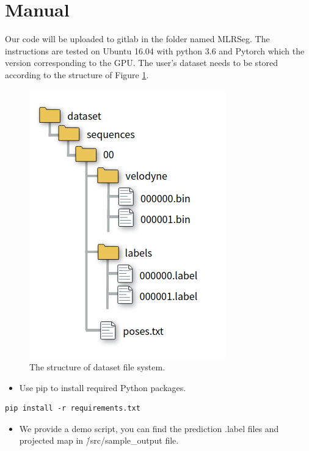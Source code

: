 \documentclass[final]{cvpr}
\begin{document}
\section{Manual}
Our code will be uploaded to gitlab in the folder named MLRSeg. The instructions are tested on Ubuntu 16.04 with python 3.6 and Pytorch which the version corresponding to the GPU. The user's dataset needs to be stored according to the structure of Figure \ref{fig:fil}.
\begin{figure}
\begin{center}
   \includegraphics[width=0.6\linewidth,height=0.8\linewidth]{latex/file.png}
\end{center}
   \caption{The structure of dataset file system.}
\label{fig:fil}
\end{figure}
\begin{itemize}
    \item Use pip to install required Python packages.
\end{itemize}
\begin{lstlisting}
pip install -r requirements.txt
\end{lstlisting}
\begin{itemize}
    \item We provide a demo script, you can find the prediction .label files and projected map in \./src/sample\_output file.
\end{itemize}
\end{document}
